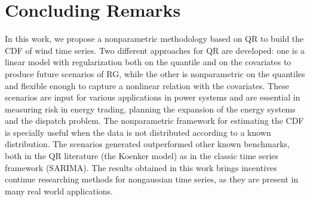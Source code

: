 \chapter{Concluding Remarks}

In this work, we propose a nonparametric methodology based on QR to build the CDF of wind time series.  Two different approaches for QR are developed: one is a linear model with regularization both on the quantile and on the covariates to produce future scenarios of RG, while the other is nonparametric on the quantiles and flexible enough to capture a nonlinear relation with the covariates. These scenarios are input for various applications in power systems and are essential in measuring risk in energy trading, planning the expansion of the energy systems and the dispatch problem. The nonparametric framework for estimating the CDF is specially useful when the data is not distributed according to a known distribution. The scenarios generated outperformed other known benchmarks, both in the QR literature (the Koenker model) as in the classic time series framework (SARIMA). The results obtained in this work brings incentives continue researching methods for nongaussian time series, as they are present in many real world applications. 